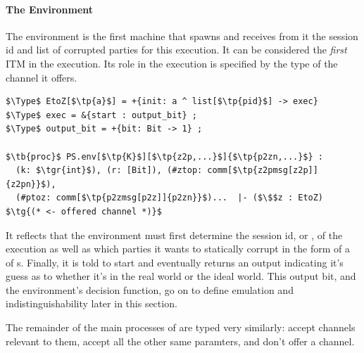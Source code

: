 
\paragraph{The Environment}
The environment is the first machine that  spawns and receives from it the session id and list of corrupted parties for this execution. 
It can be considered the \emph{first} ITM in the execution.
Its role in the execution is specified by the type  of the channel it offers.
\begin{lstlisting}[basicstyle=\footnotesize\BeraMonottFamily, mathescape, frame=single]
$\Type$ EtoZ[$\tp{a}$] = +{init: a ^ list[$\tp{pid}$] -> exec} 
$\Type$ exec = &{start : output_bit} ;
$\Type$ output_bit = +{bit: Bit -> 1} ;

$\tb{proc}$ PS.env[$\tp{K}$][$\tp{z2p,...}$]{$\tp{p2zn,...}$} : 
  (k: $\tgr{int}$), (r: [Bit]), (#ztop: comm[$\tp{z2pmsg[z2p]]{z2pn}}$), 
  (#ptoz: comm[$\tp{p2zmsg[p2z]]{p2zn}}$)...  |- ($\$$z : EtoZ) $\tg{(* <- offered channel *)}$
\end{lstlisting}
It reflects that the environment must first determine the session id, or , of the execution as well as which parties it wants to statically corrupt in the form of a  of s.
Finally, it is told to start and eventually returns an output  indicating it's guess as to whether it's in the real world or the ideal world.
This output bit, and the environment's decision function, go on to define emulation and indistinguishability later in this section. 

The remainder of the main processes of  are typed very similarly: accept channels relevant to them, accept all the other same paramters, and don't offer a channel.

